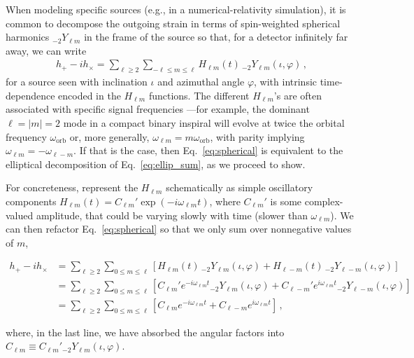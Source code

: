 \documentclass[aps,prd,twocolumn,superscriptaddress,preprintnumbers,floatfix,nofootinbib]{revtex4-2}
\begin{document}
When modeling specific sources (e.g., in a numerical-relativity simulation), it is common to decompose the outgoing strain in terms of spin-weighted spherical harmonics ${}_{-2} Y_{\ell m}$ in the frame of the source so that, for a detector infinitely far away, we can write
\begin{align} \label{eq:spherical}
h_+ - i h_\times = \sum_{\ell \geq 2} \sum_{-\ell \leq m \leq \ell} H_{\ell m}(t)\, {}_{-2}Y_{\ell m} (\iota, \varphi)\, ,
\end{align}
for a source seen with inclination $\iota$ and azimuthal angle $\varphi$, with intrinsic time-dependence encoded in the $H_{\ell m}$ functions.
The different $H_{\ell m}$'s are often associated with specific signal frequencies \cite{Thorne:1980ru}---for example, the dominant $\ell= |m|=2$ mode in a compact binary inspiral will evolve at twice the orbital frequency $\omega_\mathrm{orb}$ or, more generally, $\omega_{\ell m} = m \omega_\mathrm{orb}$, with parity implying $\omega_{\ell m}= - \omega_{\ell - m}$.
If that is the case, then Eq.~\eqref{eq:spherical} is equivalent to the elliptical decomposition of Eq.~\eqref{eq:ellip_sum}, as we proceed to show.

For concreteness, represent the $H_{\ell m}$ schematically as simple oscillatory components $H_{\ell m} (t) = C_{\ell m}' \exp\left(-i \omega_{\ell m} t\right)$, where $C_{\ell m}'$ is some complex-valued amplitude, that could be varying slowly with time (slower than $\omega_{\ell m}$).
We can then refactor Eq.~\eqref{eq:spherical} so that we only sum over nonnegative values of $m$,
\begin{widetext}
\begin{subequations} \label{eq:spherical_modes}
\begin{align}
h_+ - i h_\times &= \sum_{\ell \geq 2} \sum_{0\leq m \leq \ell} \left[H_{\ell m}(t)\, {}_{-2}Y_{\ell m} (\iota, \varphi) + H_{\ell -m}(t)\, {}_{-2}Y_{\ell -m} (\iota, \varphi) \right] \\
&= \sum_{\ell \geq 2} \sum_{0\leq m \leq \ell} \left[C_{\ell m}' e^{-i\omega_{\ell m} t} {}_{-2}Y_{\ell m}(\iota, \varphi) +  C_{\ell -m}' e^{i\omega_{\ell m} t} {}_{-2}Y_{\ell- m}(\iota, \varphi) \right] \\
&= \sum_{\ell \geq 2} \sum_{0\leq m \leq \ell} \left[C_{\ell m} e^{-i\omega_{\ell m} t}  +  C_{\ell -m} e^{i\omega_{\ell m} t} \right]\, ,
\end{align}
\end{subequations}
\end{widetext}
where, in the last line, we have absorbed the angular factors into $C_{\ell m} \equiv C_{\ell m}' {}_{-2}Y_{\ell m} (\iota, \varphi)$.
\end{document}
